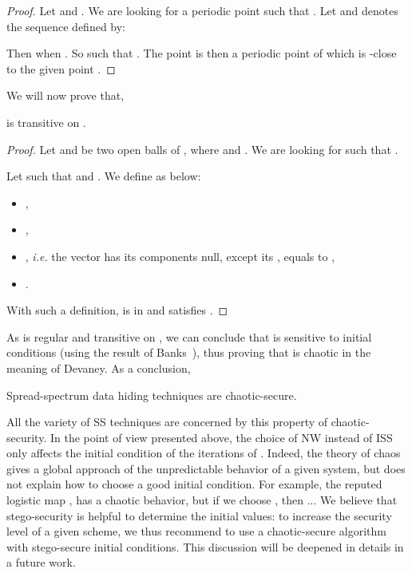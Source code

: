 \documentclass{llncs}
\begin{document}
\begin{proof}
Let  and . We are looking for a periodic point  such that . Let  and  denotes the sequence defined by:

Then  when \linebreak . So  such that . The point  is then a periodic point of  which is -close to the given point .
\end{proof}


We will now prove that,

\begin{proposition}
 is transitive on .
\end{proposition}


\begin{proof}
Let  and  be two open balls of , where  and . We are looking for  such that .

Let  such that  and . We define  as below:
\begin{itemize}
\item ,
\item ,
\item , \emph{i.e.} the vector  has its components null, except its , equals to ,
\item .
\end{itemize}
With such a definition,  is in  and satisfies .
\end{proof}


As  is regular and transitive on , we can conclude that  is sensitive to initial conditions (using the result of Banks~\cite{Banks92}), thus proving that  is chaotic in the meaning of Devaney. As a conclusion,

\begin{theorem}
Spread-spectrum data hiding techniques are chaotic-secure.
\end{theorem}

All the variety of SS techniques are concerned by this property of chaotic-security. In the point of view presented above, the choice of NW instead of ISS only affects the initial condition of the iterations of . Indeed, the theory of chaos gives a global approach of the unpredictable behavior of a given system, but does not explain how to choose a good initial condition. For example, the reputed logistic map , has a chaotic behavior, but if we choose , then ... We believe that stego-security is helpful to determine the initial values: to increase the security level of a given scheme, we thus recommend to use a chaotic-secure algorithm with stego-secure initial conditions. This discussion will be deepened in details in a future work.
\end{document}
